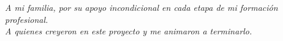 \clearpage
\thispagestyle{empty}

\vspace*{0.35\textheight}

\begin{flushright}
    \begin{minipage}{0.55\textwidth}
        \itshape \raggedleft
        A mi familia, por su apoyo incondicional en cada etapa de mi
        formación profesional.\\[0.4cm]
        A quienes creyeron en este proyecto y me animaron a terminarlo.
    \end{minipage}
\end{flushright}

\vfill
